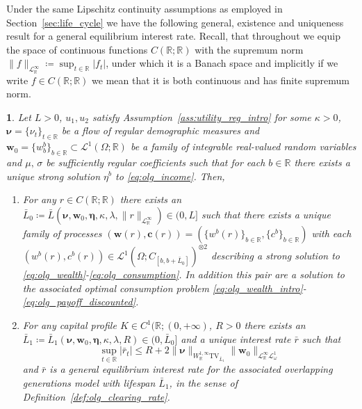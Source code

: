 \documentclass[11pt,oneside,english,reqno,dvipsnames,table]{amsart}
\numberwithin{equation}{section}
\theoremstyle{plain}
\newtheorem{thm}{\protect\theoremname}
\theoremstyle{definition}
\theoremstyle{remark}
\theoremstyle{plain}
\theoremstyle{plain}
\theoremstyle{plain}
\theoremstyle{plain}
\theoremstyle{plain}
\theoremstyle{plain}
\theoremstyle{plain}
\providecommand{\theoremname}{Theorem}
\newcommand{\red}[1]{#1}
\newcommand{\TV}{\text{TV}}
\newcommand{\bc}{\mathbf{c}}
\newcommand{\bw}{\mathbf{w}}
\newcommand{\mbR}{\mathbb{R}}
\newcommand{\mbW}{\mathbb{W}}
\newcommand{\msL}{\mathscr{L}}
\newcommand{\bmeta}{\boldsymbol{\eta}}
\newcommand{\bnu}{\boldsymbol{\nu}}
\numberwithin{thm}{section}
\begin{document}
%
Under the same Lipschitz continuity assumptions as employed in Section~\ref{sec:life_cycle} we have the following general, existence and uniqueness result for a general equilibrium interest rate. Recall, that throughout we equip the space of continuous functions $C(\mbR;\mbR)$ with the supremum norm $\|f\|_{\msL^\infty_{\mbR}}\coloneqq \sup_{t\in \mbR}|f_t|$, under which it is a Banach space and implicitly if we write $f\in C(\mbR;\mbR)$ we mean that it is both continuous and has finite supremum norm.
%

\begin{thm}\label{thm:olg_well_posed}
 Let $L>0$, $u_1, u_2$ satisfy Assumption~\ref{ass:utility_reg_intro} for some $\kappa >0$, $\bnu = \{\nu_t\}_{t\in \mbR}$ be a flow of \emph{regular demographic measures} and $\bw_0  = \{w^b_b\}_{b\in \mbR}\subset\msL^1(\Omega;\mbR)$ be a family of integrable real-valued random variables and $\mu,\,\sigma$ be sufficiently regular coefficients such that for each $b\in \mbR$ there exists a unique strong solution $\eta^b$ to \eqref{eq:olg_income}. Then, 
 \begin{enumerate}[label=\roman*)]
     \item  For any $r\in C(\mbR;\mbR)$  there exists an $\bar{L}_0\coloneqq \bar{L}(\bnu,\bw_0, \bmeta, \kappa,\lambda,\|r\|_{\msL^\infty_\mbR}) \in (0,L]$ such that  there exists a unique family of processes $(\bw(r),\bc(r)) = (\{w^b(r)\}_{b\in \mbR},\{c^b\}_{b\in \mbR})$ with each $(w^b(r),c^b(r))\in \msL^1(\Omega;C_{[b,b+\bar{L}_0]})^{\otimes 2}$ describing a strong solution to \eqref{eq:olg_wealth}-\eqref{eq:olg_consumption}. In addition this pair are a solution to the associated optimal consumption problem \eqref{eq:olg_wealth_intro}-\eqref{eq:olg_payoff_discounted}. \label{it:olg_well_posed_specific}
     \item For any capital profile $K\in C^1(\mbR;(0,+\infty)$, $R>0$ there exists an $\bar{L}_1 \coloneqq \bar{L}_1 (\bnu,\bw_0, \bmeta, \kappa,\lambda,R)\in (0,\bar{L}_0]$ and a unique interest rate $\bar{r}$ such that
     \begin{equation}\label{eq:olg_gen_eq_ball}
         \sup_{t\in \mbR} |\bar{r}_t| \leq R + 2\|\bnu\|_{W^{1,\infty}_{\mbR}\TV_{\bar{L}_1}} \|\bw_0\|_{\msL^\infty_\mbR \msL^1_\omega}
     \end{equation}
     and $\bar{r}$ is a general equilibrium interest rate for the associated overlapping generations model with lifespan $\bar{L}_1$, in the sense of Definition~\ref{def:olg_clearing_rate}. \label{it:olg_well_posed_general}
 \end{enumerate}
\end{thm}
\end{document}
